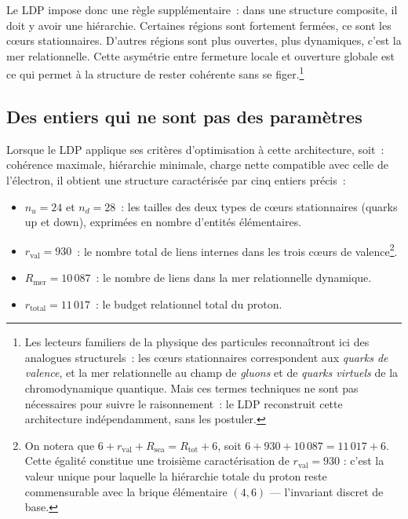 \documentclass[12pt, a4paper, openright]{book}
\begin{document}
\medskip

Le LDP impose donc une règle supplémentaire~: dans une structure composite, il doit y avoir une hiérarchie. Certaines régions sont fortement fermées, ce sont les c\oe{}urs stationnaires. D'autres régions sont plus ouvertes, plus dynamiques, c'est la mer relationnelle. Cette asymétrie entre fermeture locale et ouverture globale est ce qui permet à la structure de rester cohérente sans se figer.\footnote{Les lecteurs familiers de la physique des particules reconnaîtront ici des analogues structurels~: les c\oe{}urs stationnaires correspondent aux \emph{quarks de valence}, et la mer relationnelle au champ de \emph{gluons} et de \emph{quarks virtuels} de la chromodynamique quantique. Mais ces termes techniques ne sont pas nécessaires pour suivre le raisonnement~: le LDP reconstruit cette architecture indépendamment, sans les postuler.}

\subsection*{Des entiers qui ne sont pas des paramètres}

Lorsque le LDP applique ses critères d'optimisation à cette architecture, soit~: cohérence maximale, hiérarchie minimale, charge nette compatible avec celle de l'électron, il obtient une structure caractérisée par cinq entiers précis~:

\begin{itemize}
\item $n_u = 24$ et $n_d = 28$~: les tailles des deux types de c\oe{}urs stationnaires (quarks up et down), exprimées en nombre d'entités élémentaires.
\item $r_{\text{val}} = 930$~: le nombre total de liens internes dans les trois c\oe{}urs de valence\footnote{On notera que $6 + r_{\text{val}} + R_{\text{sea}} = R_{\text{tot}} + 6$, soit $6 + 930 + 10\,087 = 11\,017 + 6$. Cette égalité constitue une troisième caractérisation de $r_{\text{val}} = 930$ : c'est la valeur unique pour laquelle la hiérarchie totale du proton reste commensurable avec la brique élémentaire $(4,6)$ --- l'invariant discret de base.}.
\item $R_{\text{mer}} = 10\,087$~: le nombre de liens dans la mer relationnelle dynamique.
\item $r_{\text{total}} = 11\,017$~: le budget relationnel total du proton.
\end{itemize}
\end{document}

